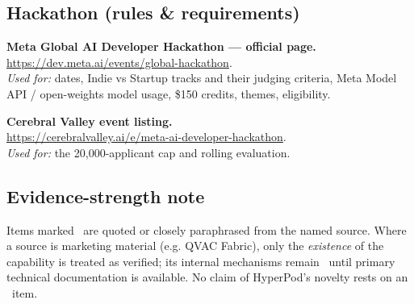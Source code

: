 \subsection{Hackathon (rules \& requirements)}
\begin{enumerate}[leftmargin=1.8em,label={[H\arabic*]}]
  \item \textbf{Meta Global AI Developer Hackathon --- official page.} \\
  \url{https://dev.meta.ai/events/global-hackathon}. \\
  \emph{Used for:} dates, Indie vs Startup tracks and their judging criteria,
  Meta Model API / open-weights model usage, \$150 credits, themes, eligibility. \VER

  \item \textbf{Cerebral Valley event listing.} \\
  \url{https://cerebralvalley.ai/e/meta-ai-developer-hackathon}. \\
  \emph{Used for:} the 20,000-applicant cap and rolling evaluation. \VER
\end{enumerate}

\subsection{Evidence-strength note}
Items marked \VER\ are quoted or closely paraphrased from the named source.
Where a source is marketing material (e.g. QVAC Fabric), only the
\emph{existence} of the capability is treated as verified; its internal
mechanisms remain \UNK\ until primary technical documentation is available. No
claim of HyperPod's novelty rests on an \UNK\ item.
